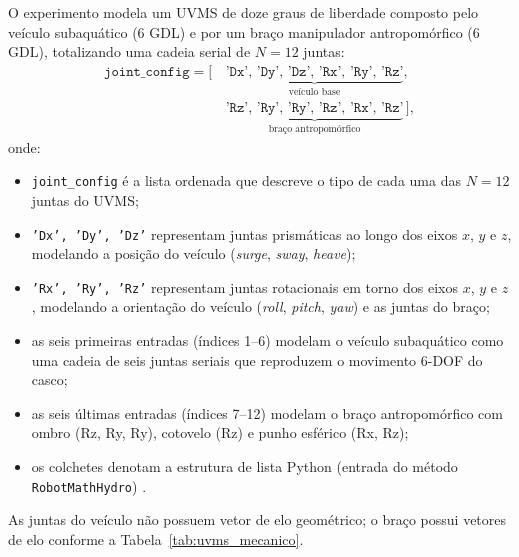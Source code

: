 O experimento modela um UVMS de doze graus de liberdade composto pelo veículo subaquático (6 GDL) e por um braço manipulador antropomórfico (6 GDL), totalizando uma cadeia serial de $N = 12$ juntas:
\begin{equation}
\begin{aligned}
    \texttt{joint\_config} = \big[\,
        & \underbrace{\texttt{'Dx'},\, \texttt{'Dy'},\, \texttt{'Dz'},\, \texttt{'Rx'},\, \texttt{'Ry'},\, \texttt{'Rz'}}_{\text{veículo base}},\, \\
        & \underbrace{\texttt{'Rz'},\, \texttt{'Ry'},\, \texttt{'Ry'},\, \texttt{'Rz'},\, \texttt{'Rx'},\, \texttt{'Rz'}}_{\text{braço antropomórfico}}\,\big],
\end{aligned}
\label{eq:uvms_config}
\end{equation}
onde:
\begin{itemize}
    \item \texttt{joint\_config} é a lista ordenada que descreve o tipo de cada uma das $N=12$ juntas do UVMS;
    \item \texttt{'Dx', 'Dy', 'Dz'} representam juntas prismáticas ao longo dos eixos $x$, $y$ e $z$, modelando a posição do veículo (\textit{surge}, \textit{sway}, \textit{heave});
    \item \texttt{'Rx', 'Ry', 'Rz'} representam juntas rotacionais em torno dos eixos $x$, $y$ e $z$, modelando a orientação do veículo (\textit{roll}, \textit{pitch}, \textit{yaw}) e as juntas do braço;
    \item as seis primeiras entradas (índices 1--6) modelam o veículo subaquático como uma cadeia de seis juntas seriais que reproduzem o movimento 6-DOF do casco;
    \item as seis últimas entradas (índices 7--12) modelam o braço antropomórfico com ombro (Rz, Ry, Ry), cotovelo (Rz) e punho esférico (Rx, Rz);
    \item os colchetes denotam a estrutura de lista Python (entrada do método \texttt{RobotMathHydro}) \cite{antonelli2014modelling, fossen2011handbook}.
\end{itemize} As juntas do veículo não possuem vetor de elo geométrico; o braço possui vetores de elo conforme a Tabela~\ref{tab:uvms_mecanico}.

